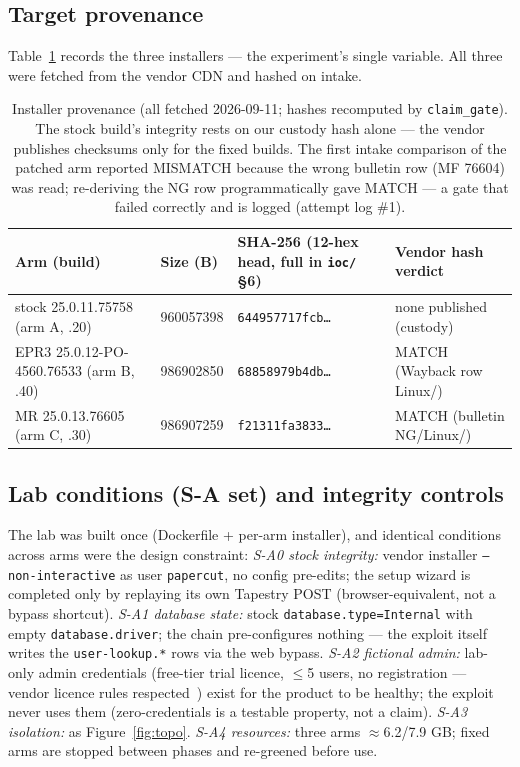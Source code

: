 \documentclass[journal]{IEEEtran}
\begin{document}
\subsection{Target provenance}
Table~\ref{tab:prov} records the three installers — the experiment's single
variable. All three were fetched from the vendor CDN and hashed on intake.

\begin{table}[t]
\centering
\caption{Installer provenance (all fetched 2026-09-11; hashes recomputed by
\texttt{claim\_gate}). The stock build's integrity rests on our custody hash
alone — the vendor publishes checksums only for the fixed builds. The first
intake comparison of the patched arm reported MISMATCH because the wrong
bulletin row (MF 76604) was read; re-deriving the NG row programmatically gave
MATCH — a gate that failed correctly and is logged (attempt log \#1).}
\label{tab:prov}
\footnotesize
\begin{tabular}{p{}p{}p{}p{}}
\toprule
Arm (build) & Size (B) & SHA-256 (12-hex head, full in \texttt{ioc/} \S6) & Vendor hash verdict \\
\midrule
stock 25.0.11.75758 (arm A, .20) & 960057398 & \texttt{644957717fcb\ldots} & none published (custody) \\
EPR3 25.0.12-PO-4560.76533 (arm B, .40) & 986902850 & \texttt{68858979b4db\ldots} & MATCH (Wayback row Linux/\allowbreak76533) \\
MR 25.0.13.76605 (arm C, .30) & 986907259 & \texttt{f21311fa3833\ldots} & MATCH (bulletin NG/\allowbreak Linux/\allowbreak76605) \\
\bottomrule
\end{tabular}
\end{table}

\subsection{Lab conditions (S-A set) and integrity controls}
The lab was built once (Dockerfile + per-arm installer), and identical
conditions across arms were the design constraint:
\emph{S-A0 stock integrity:} vendor installer \texttt{--non-interactive} as
user \texttt{papercut}, no config pre-edits; the setup wizard is completed only
by replaying its own Tapestry POST (browser-equivalent, not a bypass shortcut).
\emph{S-A1 database state:} stock \texttt{database.type=Internal} with empty
\texttt{database.driver}; the chain pre-configures nothing — the exploit itself
writes the \texttt{user-lookup.*} rows via the web bypass.
\emph{S-A2 fictional admin:} lab-only admin credentials (free-tier trial
licence, $\leq$5 users, no registration — vendor licence rules
respected~\cite{licence}) exist for the product to be healthy; the exploit never
uses them (zero-credentials is a testable property, not a claim).
\emph{S-A3 isolation:} as Figure~\ref{fig:topo}.
\emph{S-A4 resources:} three arms $\approx$6.2/7.9 GB; fixed arms are stopped
between phases and re-greened before use.
\end{document}
